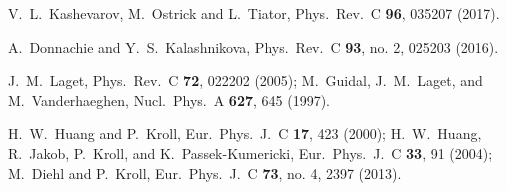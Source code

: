 \documentclass[aps,prc,twocolumn,floatfix,showpacs,preprintnumbers,amsmath,amssymb,superscriptaddress,linenumbers]{revtex4-1}
\begin{document}
\begin{thebibliography}{99}
  V.~L.~Kashevarov, M.~Ostrick and L.~Tiator,
  Phys.\ Rev.\ C {\bf 96}, 035207 (2017).

  A.~Donnachie and Y.~S.~Kalashnikova,
  Phys.\ Rev.\ C {\bf 93}, no. 2, 025203 (2016).

  J.~M.~Laget,
  Phys.\ Rev.\ C {\bf 72}, 022202 (2005);
  M.~Guidal, J.~M.~Laget, and M.~Vanderhaeghen,
  Nucl.\ Phys.\ A {\bf 627}, 645 (1997).

  H.~W.~Huang and P.~Kroll,
  Eur.\ Phys.\ J.\ C {\bf 17}, 423 (2000);
  H.~W.~Huang, R.~Jakob, P.~Kroll, and K.~Passek-Kumericki,
  Eur.\ Phys.\ J.\ C {\bf 33}, 91 (2004);
  M.~Diehl and P.~Kroll,
  Eur.\ Phys.\ J.\ C {\bf 73}, no. 4, 2397 (2013).


\end{thebibliography}
\end{document}
